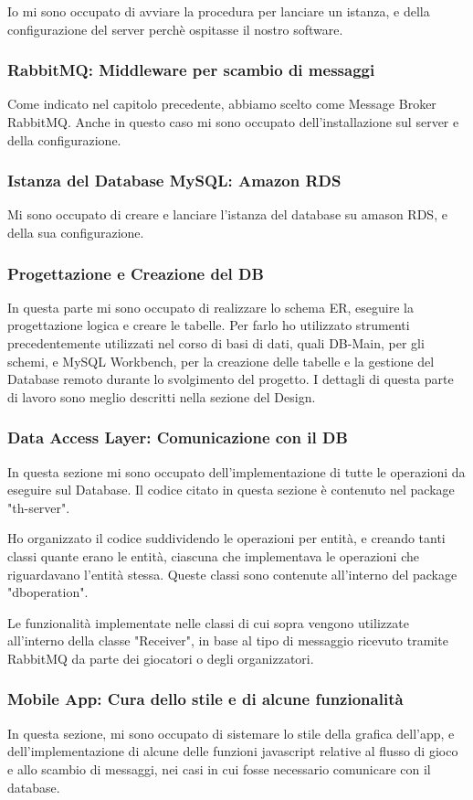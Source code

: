 \documentclass[12pt, italian]{article}
\begin{document}
Io mi sono occupato di avviare la procedura per lanciare un istanza, e della configurazione del server perchè ospitasse il nostro software.

\subsubsection{RabbitMQ: Middleware per scambio di messaggi}
Come indicato nel capitolo precedente, abbiamo scelto come Message Broker RabbitMQ. Anche in questo caso mi sono occupato dell'installazione sul server e della configurazione.
\subsubsection{Istanza del Database MySQL: Amazon RDS}
Mi sono occupato di creare e lanciare l'istanza del database su amason RDS, e della sua configurazione.
\subsubsection{Progettazione e Creazione del DB}
In questa parte mi sono occupato di realizzare lo schema ER, eseguire la progettazione logica e creare le tabelle. Per farlo ho utilizzato strumenti precedentemente utilizzati nel corso di basi di dati, quali DB-Main, per gli schemi, e MySQL Workbench, per la creazione delle tabelle e la gestione del Database remoto durante lo svolgimento del progetto. I dettagli di questa parte di lavoro sono meglio descritti nella sezione del Design.
\subsubsection{Data Access Layer: Comunicazione con il DB}
In questa sezione mi sono occupato dell'implementazione di tutte le operazioni da eseguire sul Database. Il codice citato in questa sezione è contenuto nel package "th-server". 

Ho organizzato il codice suddividendo le operazioni per entità, e creando tanti classi quante erano le entità, ciascuna che implementava le operazioni che riguardavano l'entità stessa. Queste classi sono contenute all'interno del package "dboperation".

Le funzionalità implementate nelle classi di cui sopra vengono utilizzate all'interno della classe "Receiver", in base al tipo di messaggio ricevuto tramite RabbitMQ da parte dei giocatori o degli organizzatori.

\subsubsection{Mobile App: Cura dello stile e di alcune funzionalità}
In questa sezione, mi sono occupato di sistemare lo stile della grafica dell'app, e dell'implementazione di alcune delle funzioni javascript relative al flusso di gioco e allo scambio di messaggi, nei casi in cui fosse necessario comunicare con il database.
\end{document}

